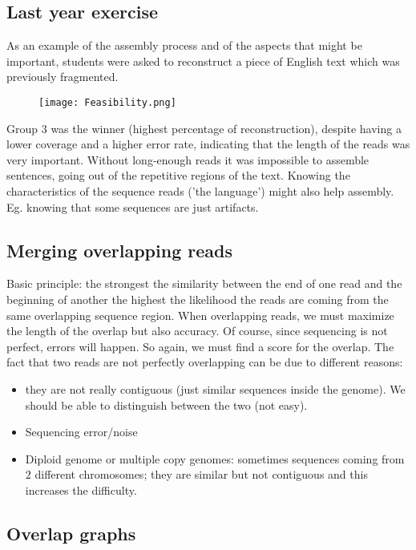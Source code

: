 \subsection{Last year exercise}

As an example of the assembly process and of the aspects that might be important, students were asked to reconstruct a piece of English text which was previously fragmented.

\begin{figure}[h]
\centering
\texttt{[image: Feasibility.png]}
\caption{}
\end{figure}

Group $3$ was the winner (highest percentage of reconstruction), despite having a lower coverage and a higher error rate, indicating that the length of the reads was very important. Without long-enough reads it was impossible to assemble sentences, going out of the repetitive regions of the text.
Knowing the characteristics of the sequence reads ('the language') might also help assembly. Eg. knowing that some sequences are just artifacts.

\subsection{Merging overlapping reads}

Basic principle: the strongest the similarity between the end of one read and the beginning of another the highest the likelihood the reads are coming from the same overlapping sequence region.
When overlapping reads, we must maximize the length of the overlap but also accuracy. Of course, since sequencing is not perfect, errors will happen. So again, we must find a score for the overlap. The fact that two reads are not perfectly overlapping can be due to different reasons:

\begin{itemize}
    \item they are not really contiguous (just similar sequences inside the genome). We should be able to distinguish between the two (not easy).
    \item Sequencing error/noise
    \item Diploid genome or multiple copy genomes: sometimes sequences coming from $2$ different chromosomes; they are similar but not contiguous and this increases the difficulty.
\end{itemize}

\subsection{Overlap graphs}

